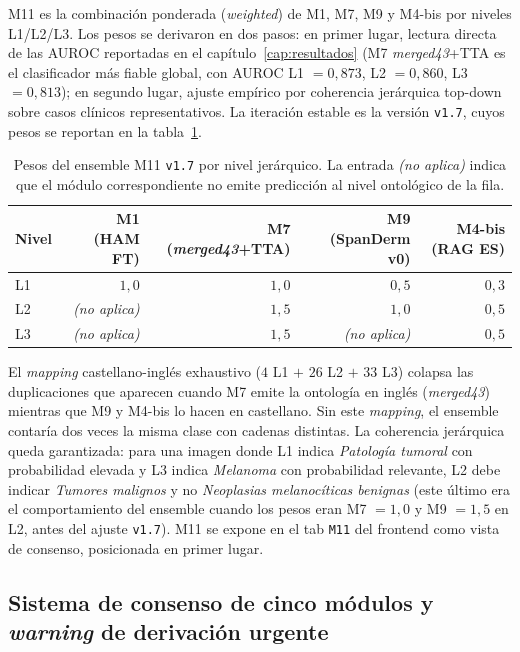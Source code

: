 M11 es la combinación ponderada (\emph{weighted}) de M1, M7, M9
y M4-bis por niveles L1/L2/L3. Los pesos se derivaron en dos
pasos: en primer lugar, lectura directa de las AUROC reportadas
en el capítulo~\ref{cap:resultados} (M7 \emph{merged43}+TTA es
el clasificador más fiable global, con AUROC L1 $= 0{,}873$,
L2 $= 0{,}860$, L3 $= 0{,}813$); en segundo lugar, ajuste empírico
por coherencia jerárquica top-down sobre casos clínicos
representativos. La iteración estable es la versión \texttt{v1.7},
cuyos pesos se reportan en la tabla~\ref{tab:m11-weights}.

\begin{table}[H]
\centering
\footnotesize
\setlength{\tabcolsep}{4pt}
\renewcommand{\arraystretch}{0.95}
\caption{Pesos del ensemble M11 \texttt{v1.7} por nivel jerárquico.
La entrada \emph{(no aplica)} indica que el módulo correspondiente
no emite predicción al nivel ontológico de la fila.}
\label{tab:m11-weights}
\begin{tabular}{lrrrr}
\hline
Nivel & M1 (HAM FT) & M7 (\emph{merged43}+TTA) & M9 (SpanDerm v0) & M4-bis (RAG ES) \\
\hline
L1   & $1{,}0$           & $1{,}0$           & $0{,}5$           & $0{,}3$           \\
L2   & \emph{(no aplica)}& $1{,}5$           & $1{,}0$           & $0{,}5$           \\
L3   & \emph{(no aplica)}& $1{,}5$           & \emph{(no aplica)}& $0{,}5$           \\
\hline
\end{tabular}
\end{table}

El \emph{mapping} castellano-inglés exhaustivo ($4$ L1
$+$ $26$ L2 $+$ $33$ L3) colapsa las duplicaciones que aparecen
cuando M7 emite la ontología en inglés (\emph{merged43}) mientras
que M9 y M4-bis lo hacen en castellano. Sin este \emph{mapping},
el ensemble contaría dos veces la misma clase con cadenas
distintas. La coherencia jerárquica queda garantizada: para una
imagen donde L1 indica \emph{Patología tumoral} con probabilidad
elevada y L3 indica \emph{Melanoma} con probabilidad relevante,
L2 debe indicar \emph{Tumores malignos} y no \emph{Neoplasias
melanocíticas benignas} (este último era el comportamiento del
ensemble cuando los pesos eran M7 $= 1{,}0$ y M9 $= 1{,}5$ en L2,
antes del ajuste \texttt{v1.7}). M11 se expone en el tab
\texttt{M11} del frontend como vista de consenso, posicionada en
primer lugar.

\subsection{Sistema de consenso de cinco módulos y \emph{warning}
de derivación urgente}
\label{sec:dermapixel-consenso}

